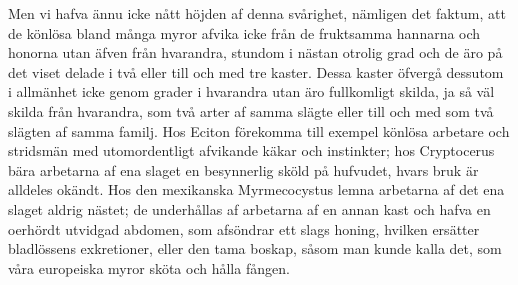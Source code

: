 Men vi hafva ännu icke nått höjden af denna svårighet, nämligen det faktum, att de könlösa bland många myror afvika icke från de fruktsamma hannarna och honorna utan äfven från hvarandra, stundom i nästan otrolig grad och de äro på det viset delade i två eller till och med tre kaster. Dessa kaster öfvergå dessutom i allmänhet icke genom grader i hvarandra utan äro fullkomligt skilda, ja så väl skilda från hvarandra, som två arter af samma slägte eller till och med som två slägten af samma familj. Hos Eciton förekomma till exempel könlösa arbetare och stridsmän med utomordentligt afvikande käkar och instinkter; hos Cryptocerus bära arbetarna af ena slaget en besynnerlig sköld på hufvudet, hvars bruk är alldeles okändt. Hos den mexikanska Myrmecocystus lemna arbetarna af det ena slaget aldrig nästet; de underhållas af arbetarna af en annan kast och hafva en oerhördt utvidgad abdomen, som afsöndrar ett slags honing, hvilken ersätter bladlössens exkretioner, eller den tama boskap, såsom man kunde kalla det, som våra europeiska myror sköta och hålla fången.

